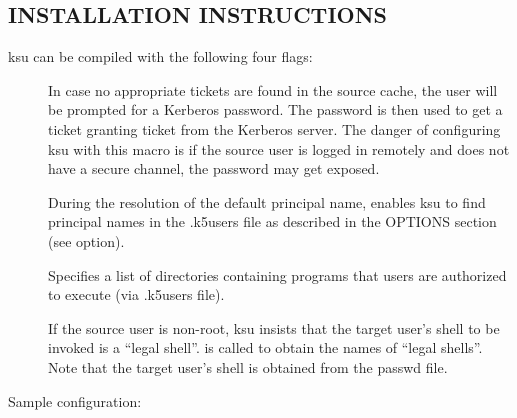 \documentclass[letterpaper,10pt,english]{sphinxmanual}
\begin{document}
\subsection{INSTALLATION INSTRUCTIONS}
\label{\detokenize{user/user_commands/ksu:installation-instructions}}
ksu can be compiled with the following four flags:
\begin{description}
\item[{}] \leavevmode
In case no appropriate tickets are found in the source cache, the
user will be prompted for a Kerberos password.  The password is
then used to get a ticket granting ticket from the Kerberos
server.  The danger of configuring ksu with this macro is if the
source user is logged in remotely and does not have a secure
channel, the password may get exposed.

\item[{}] \leavevmode
During the resolution of the default principal name,
 enables ksu to find principal names in
the .k5users file as described in the OPTIONS section
(see  option).

\item[{}] \leavevmode
Specifies a list of directories containing programs that users are
authorized to execute (via .k5users file).

\item[{}] \leavevmode
If the source user is non-root, ksu insists that the target user’s
shell to be invoked is a “legal shell”.   is
called to obtain the names of “legal shells”.  Note that the
target user’s shell is obtained from the passwd file.

\end{description}

Sample configuration:

%
\begin{sphinxVerbatim}[commandchars=\\\{\}]
    
\end{sphinxVerbatim}
\end{document}
